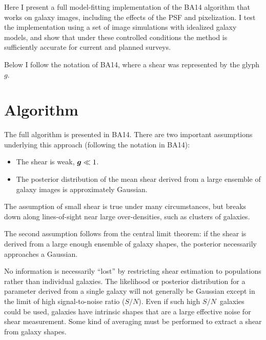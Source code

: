 \documentclass[usegraphicx,usenatbib]{mn2e}
\newcommand{\sn}{$S/N$}
\newcommand{\vecg}{\mbox{\boldmath $g$}}
\begin{document}
Here I present a full model-fitting implementation of the BA14 algorithm that
works on galaxy images, including the effects of the PSF and pixelization.  I
test the implementation using a set of image simulations with idealized galaxy
models, and show that under these controlled conditions the method is
sufficiently accurate for current and planned surveys.

Below I follow the notation of BA14, where a shear was represented by the
glyph \vecg.

\section{Algorithm} \label{sec:algo}

The full algorithm is presented in BA14.  There are two important assumptions
underlying this approach (following the notation in BA14):

\begin{itemize}

    \item The shear is weak, $\vecg \ll 1$.

    \item The posterior distribution of the mean shear derived from a large
        ensemble of galaxy images is approximately Gaussian.

\end{itemize}

The assumption of small shear is true under many circumstances, but breaks down
along lines-of-sight near large over-densities, such as clusters of galaxies.

The second assumption follows from the central limit theorem: if the shear is
derived from a large enough ensemble of galaxy shapes, the posterior
necessarily approaches a Gaussian.

No information is necessarily ``lost'' by restricting shear estimation to
populations rather than individual galaxies.  The likelihood or posterior
distribution for a parameter derived from a single galaxy will not generally be
Gaussian except in the limit of high signal-to-noise ratio (\sn). Even if such
high \sn\ galaxies could be used, galaxies have intrinsic shapes that are a
large effective noise for shear measurement.  Some kind of averaging must be
performed to extract a shear from galaxy shapes.  
\end{document}
